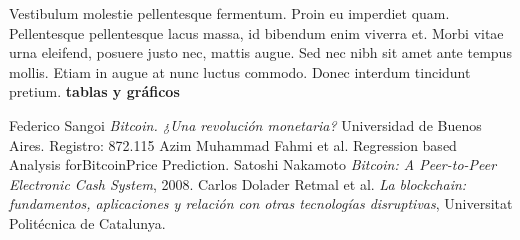 \documentclass[a4paper,12pt,twocolumn]{article}
\begin{document}
Vestibulum molestie pellentesque fermentum. Proin eu imperdiet quam. Pellentesque pellentesque lacus massa, id bibendum enim viverra et. Morbi vitae urna eleifend, posuere justo nec, mattis augue. Sed nec nibh sit amet ante tempus mollis. Etiam in augue at nunc luctus commodo. Donec interdum tincidunt pretium. 
\textbf{tablas y gráficos}

%
\begin{thebibliography}{0000}
Federico Sangoi
{\em Bitcoin. ¿Una revolución monetaria?}
Universidad de Buenos Aires. Registro: 872.115
%
\newblock Azim Muhammad Fahmi et al.
\newblock Regression based Analysis forBitcoinPrice Prediction.
Satoshi Nakamoto
{\em Bitcoin: A Peer-to-Peer Electronic Cash System}, 2008.
Carlos Dolader Retmal et al.
{\em La blockchain: fundamentos, aplicaciones y relación con otras tecnologías disruptivas}, Universitat Politécnica de Catalunya.


\end{thebibliography}
\end{document}
